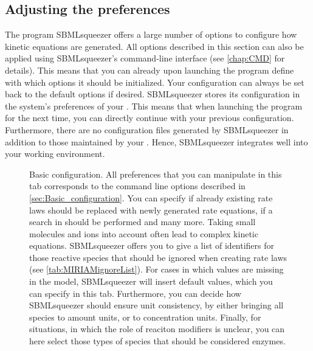 \subsection{Adjusting the preferences}
\label{sec:GUIPrefs}
The program SBMLsqueezer offers a large number of options to configure how
kinetic equations are generated.
All options described in this section can also be applied using SBMLsqueezer's
command-line interface (see \vref{chap:CMD} for details).
This means that you can already upon launching the program define with which
options it should be initialized.
Your configuration can always be set back to the default options if desired.
SBMLsqueezer stores its configuration in the system's preferences of your \OS.
This means that when launching the program for the next time, you can directly
continue with your previous configuration.
Furthermore, there are no configuration files generated by SBMLsqueezer in
addition to those maintained by your \OS.
Hence, SBMLsqueezer integrates well into your working environment.
\begin{SCfigure}
\caption{Basic configuration.
All preferences that you can manipulate in this
tab corresponds to the command line options described in
\vref{sec:Basic_configuration}. You can specify if already existing rate laws
should be replaced with newly generated rate equations, if a search in \SABIO
should be performed and many more.
Taking small molecules and ions into account often lead to complex kinetic equations.
SBMLsqueezer offers you to give a list of \KEGG identifiers for those reactive
species that should be ignored when creating rate laws (see \vref{tab:MIRIAMignoreList}).
For cases in which values are missing in the
model, SBMLsqueezer will insert default values, which you can specify in this
tab. Furthermore, you can decide how SBMLsqueezer should ensure unit consistency,
by either bringing all species to amount units, or to concentration units.
Finally, for situations, in which the role of reaciton modifiers is unclear, you
can here select those types of species that should be considered enzymes.}
\label{fig:Basic_configuration}
\end{SCfigure}

